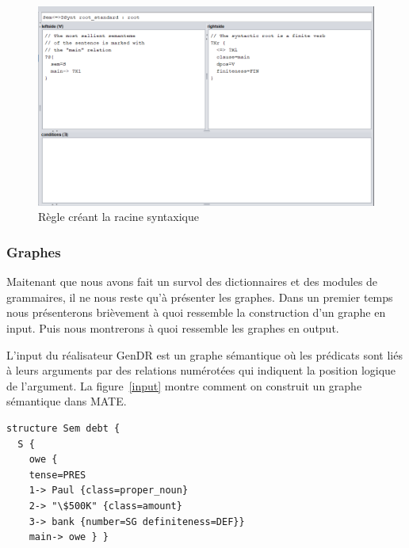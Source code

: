 \begin{figure}[htb]
	\centering
	\includegraphics[width=1\textwidth, trim = {0cm 0cm 0cm 0cm},clip]{ch3/figs/grammaire.png}
	\caption{Règle créant la racine syntaxique}
	\label{fig:root}
\end{figure}


\subsubsection{Graphes}\label{entree-sortie}

Maitenant que nous avons fait un survol des dictionnaires et des modules de grammaires, il ne nous reste qu'à présenter les graphes. Dans un premier temps nous présenterons brièvement à quoi ressemble la construction d'un graphe en input. Puis nous montrerons à quoi ressemble les graphes en output.

L'input du réalisateur GenDR est un graphe sémantique \citep{mel2012semantics} où les prédicats sont liés à leurs arguments par des relations numérotées qui indiquent la position logique de l'argument. La figure~\ref{input} montre comment on construit un graphe sémantique dans MATE.

\begin{minipage}{\linewidth}
\begin{lstlisting}[language=XML, caption = Input sémantique, label=input]
structure Sem debt {
  S {
    owe {
    tense=PRES
    1-> Paul {class=proper_noun}
    2-> "\$500K" {class=amount}
    3-> bank {number=SG definiteness=DEF}}
    main-> owe } }
\end{lstlisting}
\end{minipage}


